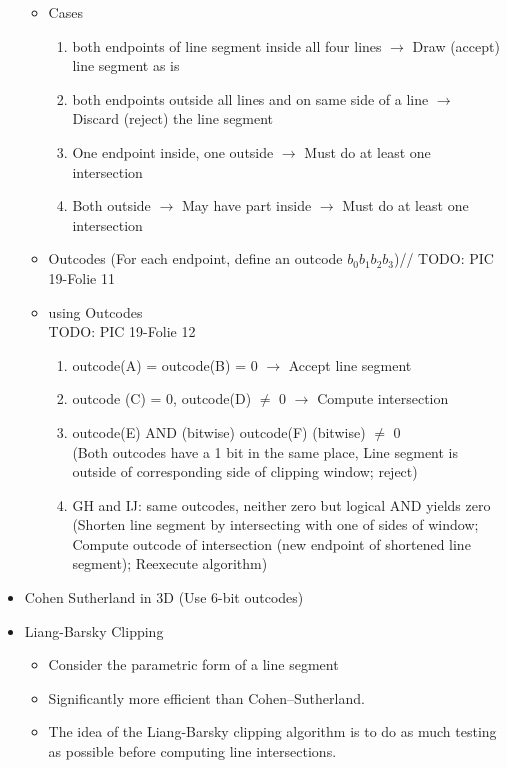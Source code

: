 \documentclass[11pt,a4paper]{article}
\begin{document}
\begin{itemize}
\begin{itemize}
					\item Cases
						\begin{enumerate}
							\item both endpoints of line segment inside all four lines $\rightarrow$ Draw (accept) line segment as is
							\item both endpoints outside all lines and on same side of a line $\rightarrow$ Discard (reject) the line segment
							\item One endpoint inside, one outside $\rightarrow$ Must do at least one intersection
							\item Both outside $\rightarrow$ May have part inside $\rightarrow$ Must do at least one intersection
						\end{enumerate}
					\item Outcodes (For each endpoint, define an outcode $b_0b_1b_2b_3$)//
					TODO: PIC 19-Folie 11
					\item using Outcodes\\
					TODO: PIC 19-Folie 12
						\begin{enumerate}
							\item outcode(A) = outcode(B) = 0 $\rightarrow$ Accept line segment
							\item outcode (C) = 0, outcode(D) $\ne$ 0 $\rightarrow$ Compute intersection
							\item outcode(E) AND (bitwise) outcode(F) (bitwise) $\ne$ 0\\
							(Both outcodes have a 1 bit in the same place, Line segment is outside of corresponding side of clipping window; reject)
							\item GH and IJ: same outcodes, neither zero but logical AND yields zero\\
							(Shorten line segment by intersecting with one of sides of window; Compute outcode of intersection (new endpoint of shortened line segment); Reexecute algorithm)
						\end{enumerate}
				\end{itemize}
			\item Cohen Sutherland in 3D (Use 6-bit outcodes)
			\item Liang-Barsky Clipping
				\begin{itemize}
					\item Consider the parametric form of a line segment
					\item Significantly more efficient than Cohen–Sutherland.
					\item The idea of the Liang-Barsky clipping algorithm is to do as much testing as possible before computing line intersections.

\end{itemize}
\end{itemize}
\end{document}
